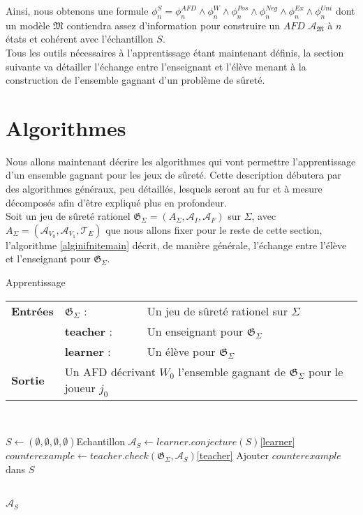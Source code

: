 \documentclass[12pt,a4paper,oneside,titlepage]{report}
\begin{document}
Ainsi, nous obtenons une formule $\phi^S_n=\phi_n^{AFD}\land\phi_n^{W}\land\phi_n^{Pos}\land\phi_n^{Neg}\land\phi_n^{Ex}\land\phi_n^{Uni}$ dont un modèle $\mathfrak{M}$ contiendra assez d'information pour construire un $AFD$ $\mathcal{A}_\mathfrak{M}$ à $n$ états et cohérent avec l'échantillon $S$.\\

Tous les outils nécessaires à l'apprentissage étant maintenant définis, la section suivante va détailler l'échange entre l'enseignant et l'élève menant à la construction de l'ensemble gagnant d'un problème de sûreté.
\newpage
\section{Algorithmes}
Nous allons maintenant décrire les algorithmes qui vont permettre l'apprentissage d'un ensemble gagnant pour les jeux de sûreté. 
Cette description débutera par des algorithmes généraux, peu détaillés, lesquels seront au fur et à mesure décomposés afin d'être expliqué plus en profondeur.\\
Soit un jeu de sûreté rationel $\mathfrak{G}_\Sigma=(A_\Sigma, \mathcal{A}_I, \mathcal{A}_F)$ sur $\Sigma$, avec $A_\Sigma=(\mathcal{A}_{V_0}, \mathcal{A}_{V_1}, \mathcal{T}_E)$ que nous allons fixer pour le reste de cette section, l'algorithme \ref{alginifnitemain} décrit, de manière générale, l'échange entre l'élève et l'enseignant pour $\mathfrak{G}_\Sigma$.
\begin{algorithm}[H]
\caption{Apprentissage}\label{alginifnitemain}
\hspace*{\algorithmicindent} 
\begin{tabular}{lll}
	\textbf{Entrées} & \textbf{$\mathfrak{G}_\Sigma$} : &Un jeu de sûreté rationel sur $\Sigma$\\
	&\textbf{teacher} : &Un enseignant pour $\mathfrak{G}_\Sigma$\\
	&\textbf{learner} : &Un élève pour $\mathfrak{G}_\Sigma$\\
	\textbf{Sortie} &\multicolumn{2}{l}{Un AFD décrivant $W_0$ l'ensemble gagnant de $\mathfrak{G}_\Sigma$ pour le joueur $j_0$}\\
\end{tabular}\\
\begin{algorithmic}[1]
\State $S\gets(\emptyset,\emptyset,\emptyset,\emptyset)$\Comment Echantillon
\Repeat
	\State $\mathcal{A}_S \gets learner.conjecture(S)$\Comment \ref{learner}
	\State $counterexample\gets teacher.check(\mathfrak{G}_\Sigma, \mathcal{A}_S)$\Comment\ref{teacher}
		\State Ajouter $counterexample$ dans $S$
	\EndIf
		
\\
\Return $\mathcal{A}_S$
\end{algorithmic}
\end{algorithm}
\end{document}
